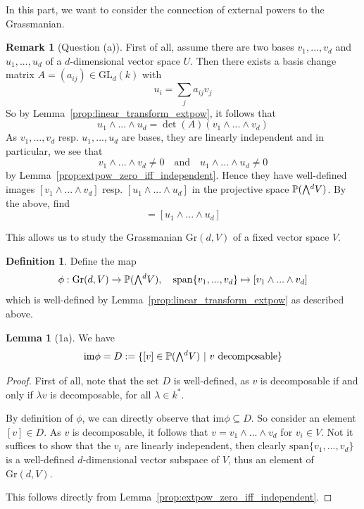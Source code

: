 \documentclass{scrartcl}
\newcommand{\Proj}{\mathbb{P}}
\newcommand{\GL}{\mathrm{GL}}
\newcommand{\Gr}{\mathrm{Gr}}
\newcommand{\extpow}{\mathchoice{{\textstyle\bigwedge}}
    {{\bigwedge}}
    {{\textstyle\wedge}}
    {{\scriptstyle\wedge}}}
\newcommand{\vspan}{\mathrm{span}}
\theoremstyle{definition}
\newtheorem{definition}[subsection]{Definition}
\newtheorem{remark}[subsection]{Remark}
\newtheorem{lemma}[subsection]{Lemma}
\begin{document}
In this part, we want to consider the connection of external powers to the Grassmanian.
\begin{remark}[Question (a)]
    First of all, assume there are two bases $v_1, ..., v_d$ and $u_1, ..., u_d$ of a $d$-dimensional vector space $U$. 
    Then there exists a basis change matrix $A = (a_{ij}) \in \GL_d(k)$ with
    \begin{equation*}
        u_i = \sum_j a_{ij} v_j
    \end{equation*}
    So by Lemma~\ref{prop:linear_transform_extpow}, it follows that
    \begin{equation*}
        u_1 \wedge ... \wedge u_d = \det(A) (v_1 \wedge ... \wedge v_d)
    \end{equation*}
    As $v_1, ..., v_d$ resp. $u_1, ..., u_d$ are bases, they are linearly independent and in particular, we see that
    \begin{equation*}
        v_1 \wedge ... \wedge v_d \neq 0 \quad \text{and} \quad u_1 \wedge ... \wedge u_d \neq 0
    \end{equation*}
    by Lemma~\ref{prop:extpow_zero_iff_independent}.
    Hence they have well-defined images $[v_1 \wedge ... \wedge v_d]$ resp. $[u_1 \wedge ... \wedge u_d]$ in the projective space $\Proj(\extpow^d V)$.
    By the above, find
    \begin{equation*}
        [v_1 \wedge ... \wedge v_d] = [u_1 \wedge ... \wedge u_d]
    \end{equation*}
\end{remark}
This allows us to study the Grassmanian $\Gr(d, V)$ of a fixed vector space $V$.
\begin{definition}
    Define the map
    \begin{equation*}
        \phi: \Gr(d, V) \to \Proj(\extpow^d V), \quad \vspan\{v_1, ..., v_d\} \mapsto [v_1 \wedge ... \wedge v_d]
    \end{equation*}
    which is well-defined by Lemma~\ref{prop:linear_transform_extpow} as described above.
\end{definition}
\begin{lemma}[1a]
    We have
    \begin{equation*}
        \mathrm{im}\phi = D := \{ [v] \in \Proj(\extpow^d V) \ | \ \text{$v$ decomposable}\}
    \end{equation*}
\end{lemma}
\begin{proof}
    First of all, note that the set $D$ is well-defined, as $v$ is decomposable if and only if $\lambda v$ is decomposable, for all $\lambda \in k^*$.

    By definition of $\phi$, we can directly observe that $\mathrm{im}\phi \subseteq D$.
    So consider an element $[v] \in D$.
    As $v$ is decomposable, it follows that $v = v_1 \wedge ... \wedge v_d$ for $v_i \in V$.
    Not it suffices to show that the $v_i$ are linearly independent, then clearly $\vspan\{v_1, ..., v_d\}$ is a well-defined $d$-dimensional vector subspace of $V$, thus an element of $\Gr(d, V)$.

    This follows directly from Lemma~\ref{prop:extpow_zero_iff_independent}.
\end{proof}
\end{document}

